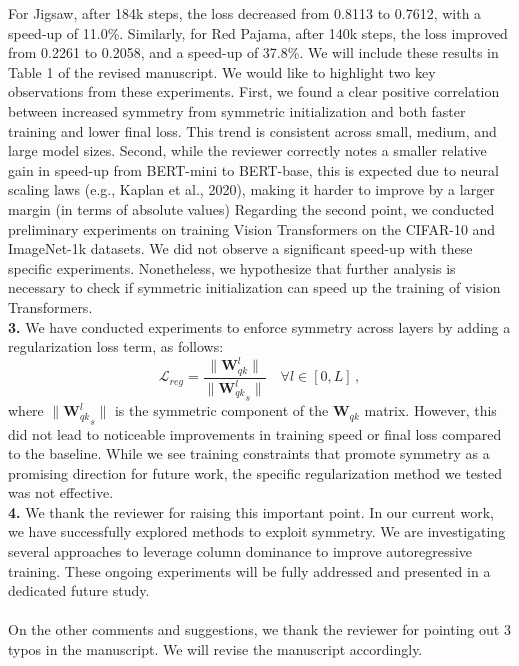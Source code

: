 \documentclass[11pt]{article}
\begin{document}
For Jigsaw, after 184k steps, the loss decreased from 0.8113 to 0.7612, with a speed-up of 11.0\%.
Similarly, for Red Pajama, after 140k steps, the loss improved from 0.2261 to 0.2058, and a speed-up of 37.8\%.
We will include these results in Table 1 of the revised manuscript.
%
We would like to highlight two key observations from these experiments. First, we found a clear positive correlation between increased symmetry from symmetric initialization and both faster training and lower final loss. This trend is consistent across small, medium, and large model sizes. Second, while the reviewer correctly notes a smaller relative gain in speed-up from BERT-mini to BERT-base, this is expected due to neural scaling laws (e.g., Kaplan et al., 2020), making it harder to improve by a larger margin (in terms of absolute values)
%
Regarding the second point, we conducted preliminary experiments on training Vision Transformers on the CIFAR-10 and ImageNet-1k datasets.
%
We did not observe a significant speed-up with these specific experiments. Nonetheless, we hypothesize that further analysis is necessary to check if symmetric initialization can speed up the training of vision Transformers.
%
%
\\
%
\textbf{3.} We have conducted experiments to enforce symmetry across layers by adding a regularization loss term, as follows:
%
\[
\mathcal{L}_{reg} = \frac{\| \mathbf{W}^l_{qk}\|}{\| {\mathbf{W}^l_{qk}}_s\|} \quad \forall l \in [0,L]\,,
\]
%
where $\| {\mathbf{W}^l_{qk}}_s\|$ is the symmetric component of the $\mathbf{W}_{qk}$ matrix.
%
However, this did not lead to noticeable improvements in training speed or final loss compared to the baseline. While we see training constraints that promote symmetry as a promising direction for future work, the specific regularization method we tested was not effective.
%
\\
\textbf{4.} We thank the reviewer for raising this important point. In our current work, we have successfully explored methods to exploit symmetry. We are investigating several approaches to leverage column dominance to improve autoregressive training. These ongoing experiments will be fully addressed and presented in a dedicated future study.  
% 
\\\\
%
On the other comments and suggestions, we thank the reviewer for pointing out 3 typos in the manuscript. We will revise the manuscript accordingly.
%
\\\\
%


\newpage
\end{document}
